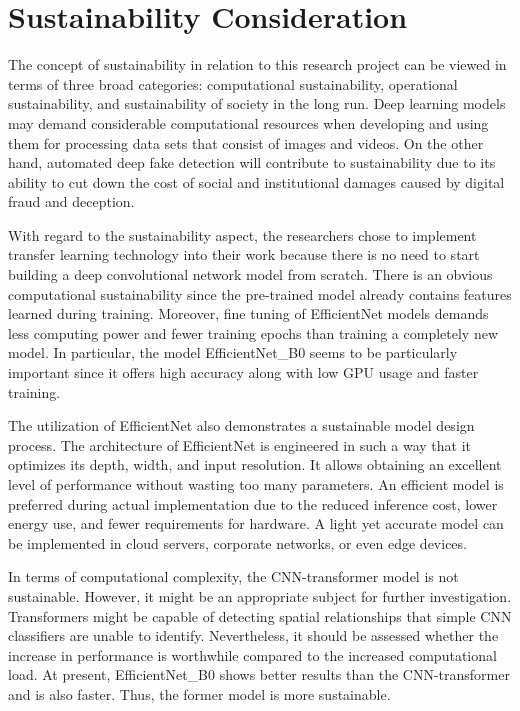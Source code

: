 \documentclass[12pt,a4paper]{report}
\begin{document}
\section{Sustainability Consideration}

The concept of sustainability in relation to this research project can be viewed in terms of three broad categories: computational sustainability, operational sustainability, and sustainability of society in the long run. Deep learning models may demand considerable computational resources when developing and using them for processing data sets that consist of images and videos. On the other hand, automated deep fake detection will contribute to sustainability due to its ability to cut down the cost of social and institutional damages caused by digital fraud and deception.

With regard to the sustainability aspect, the researchers chose to implement transfer learning technology into their work because there is no need to start building a deep convolutional network model from scratch. There is an obvious computational sustainability since the pre-trained model already contains features learned during training. Moreover, fine tuning of EfficientNet models demands less computing power and fewer training epochs than training a completely new model. In particular, the model EfficientNet\_B0 seems to be particularly important since it offers high accuracy along with low GPU usage and faster training. 

The utilization of EfficientNet also demonstrates a sustainable model design process. The architecture of EfficientNet is engineered in such a way that it optimizes its depth, width, and input resolution. It allows obtaining an excellent level of performance without wasting too many parameters. An efficient model is preferred during actual implementation due to the reduced inference cost, lower energy use, and fewer requirements for hardware. A light yet accurate model can be implemented in cloud servers, corporate networks, or even edge devices.

In terms of computational complexity, the CNN-transformer model is not sustainable. However, it might be an appropriate subject for further investigation. Transformers might be capable of detecting spatial relationships that simple CNN classifiers are unable to identify. Nevertheless, it should be assessed whether the increase in performance is worthwhile compared to the increased computational load. At present, EfficientNet\_B0 shows better results than the CNN-transformer and is also faster. Thus, the former model is more sustainable.
\end{document}
